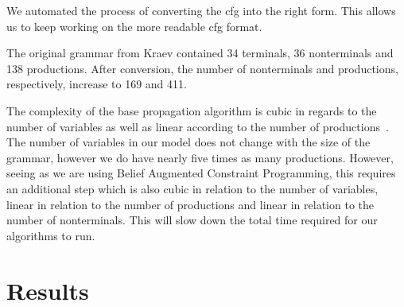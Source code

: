 \documentclass[../Document.tex]{subfiles}
\begin{document}

We automated the process of converting the \gls{cfg} into the right form. This allows us to keep working on the more readable \gls{cfg} format.

The original grammar from Kraev contained 34 terminals, 36 nonterminals and 138 productions. After conversion, the number of nonterminals and productions, respectively, increase to 169 and 411.

The complexity of the base propagation algorithm is cubic in regards to the number of variables as well as linear according to the number of productions~\cite{quimper2006}. The number of variables in our model does not change with the size of the grammar, however we do have nearly five times as many productions.
However, seeing as we are using Belief Augmented Constraint Programming, this requires an additional step which is also cubic in relation to the number of variables, linear in relation to the number of productions and linear in relation to the number of nonterminals.
This will slow down the total time required for our algorithms to run.


\section{Results}
\end{document}
